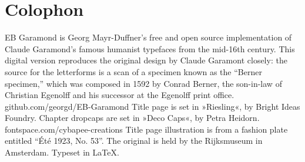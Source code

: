 \documentclass[
a5paper,
BCOR=7mm,
twoside,
DIV=calc,
11pt,
usegeometry,
headings=big]{scrbook} %
\begin{document}
\clearpage
{}
\chapter*{Colophon}
\begin{center}
EB Garamond is Georg Mayr-Duffner's free and open source implementation of Claude Garamond’s famous humanist typefaces from the mid-16th century. This digital version reproduces the original design by Claude Garamont closely: the source for the letterforms is a scan of a specimen known as the \enquote{Berner specimen,} which was composed in 1592 by Conrad Berner, the son-in-law of Christian Egenolff and his successor at the Egenolff print office.  \\github.com/georgd/EB-Garamond
\vfill
Title page is set in »Riesling«, by Bright Ideas Foundry.
\vfill
Chapter dropcaps are set in »Deco Caps«, by Petra Heidorn.\\fontspace.com/cybapee-creations
\vfill
Title page illustration is from a fashion plate entitled \foreignquote{french}{Été 1923, No. 53}. The original is held by the Rijksmuseum in Amsterdam.
\vfill
Typeset in \LaTeX{}.
\end{center}
\thispagestyle{empty}
\end{document}
